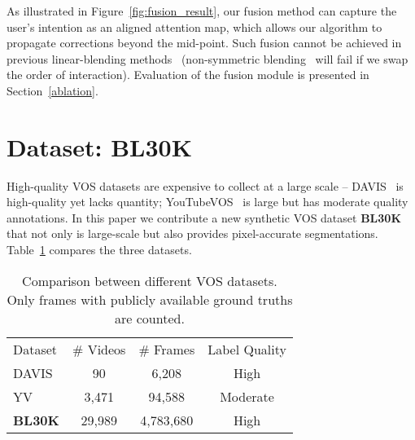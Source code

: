 \documentclass[final]{cvpr}
\begin{document}
	As illustrated in Figure~\ref{fig:fusion_result}, our fusion method can capture the user's intention as an aligned attention map, which allows our algorithm to propagate corrections beyond the mid-point. Such fusion cannot be achieved in previous linear-blending methods~\cite{oh2019fastInteractive,Yuk2020IVOSGlobalLocal} (non-symmetric blending~\cite{Yuk2020IVOSGlobalLocal} will fail if we swap the order of interaction).
	Evaluation of the fusion module is presented in Section~\ref{ablation}.
	
	\vspace{-2mm}
	\section{Dataset: BL30K}\label{dataset}
	High-quality VOS datasets are expensive to collect at a large scale -- DAVIS~\cite{Caelles_arXiv_2019} is high-quality yet lacks quantity; YouTubeVOS~\cite{xu2018youtubeVOS} is large but has moderate quality annotations. In this paper we contribute a new synthetic VOS dataset \textbf{BL30K} that not only is large-scale but also provides pixel-accurate segmentations. Table~\ref{tab:multiclass_table} compares the three datasets. 
	
	\begin{table}[h]
		\small
		\centering
		\vspace{-0.07in}
		\begin{tabular}{l|c|c|c}
			\hline
			Dataset & \# Videos & \# Frames & Label Quality \\
			\Xhline{3\arrayrulewidth}
			DAVIS~\cite{Caelles_arXiv_2019} & 90 & 6,208 & High \\
			\hline
			YV~\cite{xu2018youtubeVOS} & 3,471 & 94,588 & Moderate \\
			\hline
			{\bf BL30K} & 29,989 & 4,783,680 & High \\
			\hline
		\end{tabular}
		\caption{Comparison between different VOS datasets. Only frames with publicly available ground truths are counted.}
		\label{tab:multiclass_table}
		\vspace{-0.15in}
	\end{table}
	
\end{document}
